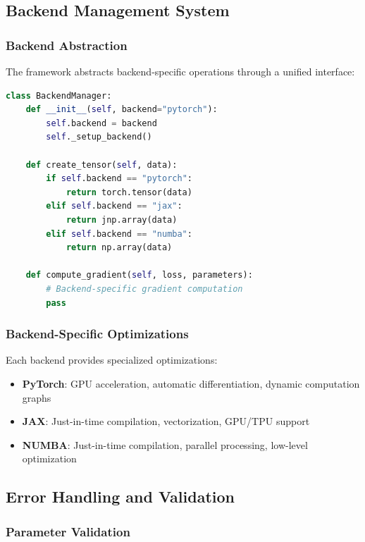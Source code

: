 \subsection{Backend Management System}

\subsubsection{Backend Abstraction}

The framework abstracts backend-specific operations through a unified interface:

\begin{lstlisting}[language=Python, caption=Backend Abstraction]
class BackendManager:
    def __init__(self, backend="pytorch"):
        self.backend = backend
        self._setup_backend()
    
    def create_tensor(self, data):
        if self.backend == "pytorch":
            return torch.tensor(data)
        elif self.backend == "jax":
            return jnp.array(data)
        elif self.backend == "numba":
            return np.array(data)
    
    def compute_gradient(self, loss, parameters):
        # Backend-specific gradient computation
        pass
\end{lstlisting}

\subsubsection{Backend-Specific Optimizations}

Each backend provides specialized optimizations:

\begin{itemize}
    \item \textbf{PyTorch}: GPU acceleration, automatic differentiation, dynamic computation graphs
    \item \textbf{JAX}: Just-in-time compilation, vectorization, GPU/TPU support
    \item \textbf{NUMBA}: Just-in-time compilation, parallel processing, low-level optimization
\end{itemize}

\subsection{Error Handling and Validation}

\subsubsection{Parameter Validation}

